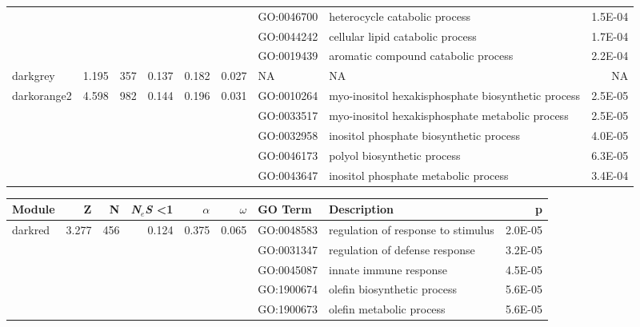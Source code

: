 \begin{landscape}
\begin{table}[ht]
\begin{tabular}{|l|rrrrrlP{5cm}r|}
   &  &  &  &  &  & GO:0046700 & heterocycle catabolic process & 1.5E-04 \\ 
   &  &  &  &  &  & GO:0044242 & cellular lipid catabolic process & 1.7E-04 \\ 
   &  &  &  &  &  & GO:0019439 & aromatic compound catabolic process & 2.2E-04 \\ 
\hline 
 darkgrey & 1.195 & 357 & 0.137 & 0.182 & 0.027 &  NA &  NA & NA \\ 
\hline
  darkorange2 & 4.598 & 982 & 0.144 & 0.196 & 0.031 & GO:0010264 & myo-inositol hexakisphosphate biosynthetic process & 2.5E-05 \\ 
   &  &  &  &  &  & GO:0033517 & myo-inositol hexakisphosphate metabolic process & 2.5E-05 \\ 
   &  &  &  &  &  & GO:0032958 & inositol phosphate biosynthetic process & 4.0E-05 \\ 
   &  &  &  &  &  & GO:0046173 & polyol biosynthetic process & 6.3E-05 \\ 
   &  &  &  &  &  & GO:0043647 & inositol phosphate metabolic process & 3.4E-04 \\ 
\hline
\end{tabular}
\end{table}


\begin{table}[ht]
\centering
\begin{tabular}{|l|rrrrrlP{5cm}r|}
  \hline
Module & Z & N & \textit{N$_{e}$S} \textless 1& $\alpha$ & $\omega$ & GO Term & Description & p \\ 
  \hline
  darkred & 3.277 & 456 & 0.124 & 0.375 & 0.065 & GO:0048583 & regulation of response to stimulus & 2.0E-05 \\ 
   &  &  &  &  &  & GO:0031347 & regulation of defense response & 3.2E-05 \\ 
   &  &  &  &  &  & GO:0045087 & innate immune response & 4.5E-05 \\ 
   &  &  &  &  &  & GO:1900674 & olefin biosynthetic process & 5.6E-05 \\ 
   &  &  &  &  &  & GO:1900673 & olefin metabolic process & 5.6E-05 \\ 
\hline


\end{tabular}
\end{table}
\end{landscape}
